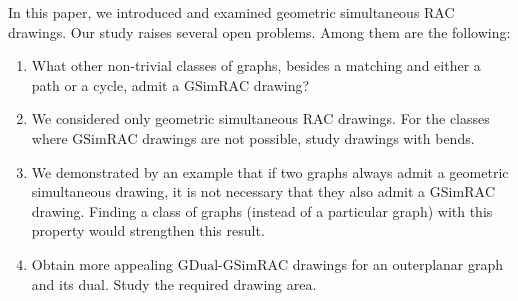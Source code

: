 \documentclass{llncs}
\newcommand{\GSimRAC}{\mathrm{GSimRAC}}
\newcommand{\GDual}{\mathrm{GDual\text{-}GSimRAC}}
\begin{document}
In this paper, we introduced and examined geometric simultaneous RAC
drawings. Our study raises several open problems. Among them are the
following:
\begin{enumerate}
  \item What other non-trivial classes of graphs, besides a matching and
  either a path or a cycle, admit a $\GSimRAC$ drawing?
  \item We considered only geometric simultaneous RAC drawings. For
  the classes where $\GSimRAC$ drawings are not possible, study
  drawings with bends.
  \item We demonstrated by an example that if two graphs always admit a geometric
  simultaneous drawing, it is not necessary that they also admit a
  $\GSimRAC$ drawing. Finding a class of graphs (instead of a particular
  graph) with this property would strengthen this result.
\item Obtain more appealing $\GDual$ drawings for an outerplanar
  graph and its dual. Study the required drawing area.
\end{enumerate}
\end{document}

